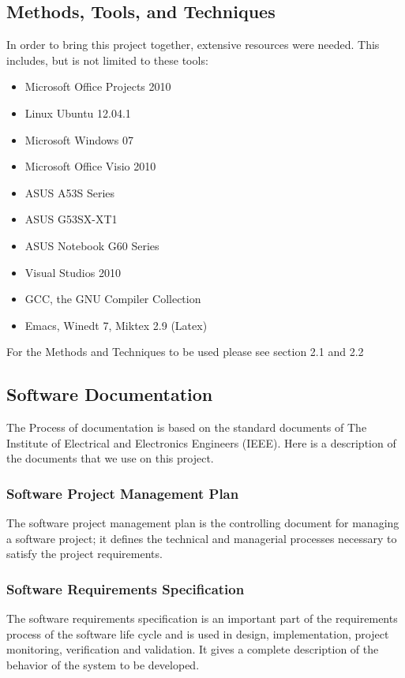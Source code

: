\documentclass[12pt]{article}
\begin{document}
\subsection{Methods, Tools, and Techniques}
In order to bring this project together, extensive resources were needed. This includes, but is not limited to these tools:

\begin{itemize}
  \item Microsoft Office Projects 2010
  \item Linux Ubuntu 12.04.1
  \item Microsoft Windows 07
  \item Microsoft Office Visio 2010
  \item ASUS A53S Series
  \item ASUS G53SX-XT1
  \item ASUS Notebook G60 Series
  \item Visual Studios 2010
  \item GCC, the GNU Compiler Collection
  \item Emacs, Winedt 7, Miktex 2.9 (Latex)
\end{itemize}

For the Methods and Techniques to be used please see section 2.1 and 2.2

\subsection{Software Documentation}
The Process of documentation is based on the standard documents of The Institute of Electrical and Electronics Engineers (IEEE). Here is a description of the documents that we use on this project.

\subsubsection{Software Project Management Plan}
The software project management plan is the controlling document for managing a software project; it defines the technical and managerial processes necessary to satisfy the project requirements.

\subsubsection{Software Requirements Specification}
The software requirements specification is an important part of the requirements process of the software life cycle and is used in design, implementation, project monitoring, verification and validation. It gives a complete description of the behavior of the system to be developed.
\end{document}
